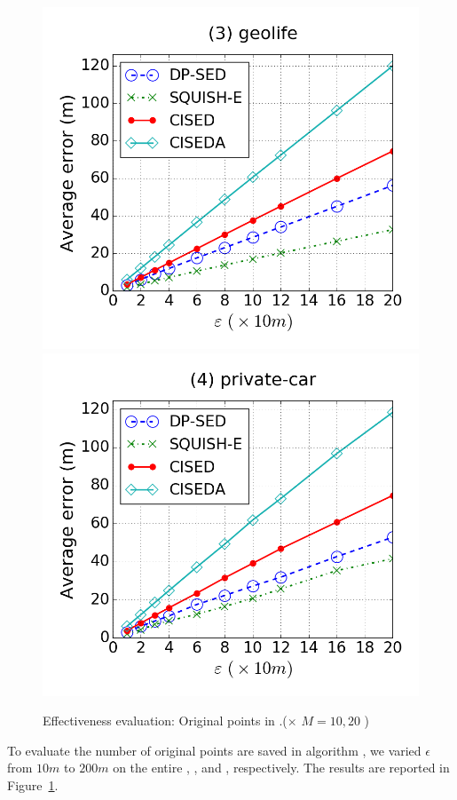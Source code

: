 {\begin{figure}[tb]
\includegraphics[scale = 0.250]{figures/Exp-error-epsilon-geolife.png}
\includegraphics[scale = 0.250]{figures/Exp-error-epsilon-private.png}
\vspace{-2ex}
\caption{\small Effectiveness evaluation: Original points in \cista.(\cista  $\times$ $M = 10, {20}$ )}
\label{fig:orig-points}
\vspace{-2ex}
\end{figure}

To evaluate the number of original points are saved in algorithm \cista, we varied $\epsilon$ from $10m$ to $200m$ on the entire \truck, \sercar, \geolife and \pricar, respectively.
The results are reported in Figure~\ref{fig:orig-points}.
}





